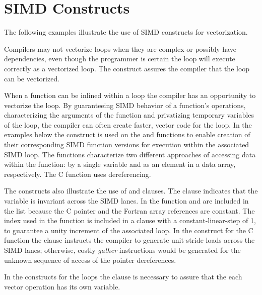 \pagebreak
\chapter{SIMD Constructs}
\label{chap:SIMD}

The following examples illustrate the use of SIMD constructs for vectorization.

Compilers may not vectorize loops when they are complex or possibly have 
dependencies, even though the programmer is certain the loop will execute 
correctly as a vectorized loop.  The  construct assures the compiler 
that the loop can be vectorized.


 

When a function can be inlined within a loop the compiler has an opportunity to 
vectorize the loop. By guaranteeing SIMD behavior of a function's operations, 
characterizing the arguments of the function and privatizing temporary 
variables of the loop, the compiler can often create faster, vector code for 
the loop. In the examples below the   construct is 
used on the  and  functions to enable creation of their 
corresponding SIMD function versions for execution within the associated SIMD 
loop. The functions characterize two different approaches of accessing data 
within the function: by a single variable and as an element in a data array, 
respectively. The  C function uses dereferencing.

The   constructs also illustrate the use of 
 and  clauses.  The  clause 
indicates that the variable  is invariant across the SIMD lanes. In 
the  function  and  are included in the  
list because the C pointer and the Fortran array references are constant.  The 
 index used in the  function is included in a  
clause with a constant-linear-step of 1, to guarantee a unity increment of the 
associated loop. In the   construct for the  
C function the   clause instructs the compiler to generate 
unit-stride loads across the SIMD lanes; otherwise,  costly \emph{gather} 
instructions would be generated for the unknown sequence of access of the 
pointer dereferences.

In the  constructs for the loops the  clause is 
necessary to assure that the each vector operation has its own  
variable.

